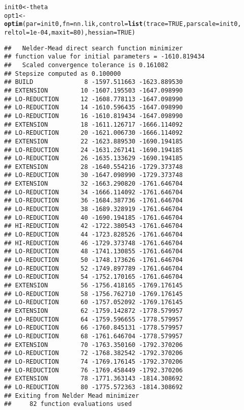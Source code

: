 \documentclass{article}\usepackage{graphicx, color}
\makeatletter
\newcommand{\hlfunctioncall}[1]{\textcolor[rgb]{0.501960784313725,0,0.329411764705882}{\textbf{#1}}}%
\newenvironment{kframe}{%
 \def\at@end@of@kframe{}%
 \ifinner\ifhmode%
  \def\at@end@of@kframe{\end{minipage}}%
  \begin{minipage}{\columnwidth}%
 \fi\fi%
 \def\FrameCommand##1{\hskip\@totalleftmargin \hskip-\fboxsep
 \colorbox{shadecolor}{##1}\hskip-\fboxsep
     \hskip-\linewidth \hskip-\@totalleftmargin \hskip\columnwidth}%
 \MakeFramed {\advance\hsize-\width
   \@totalleftmargin\z@ \linewidth\hsize
   \@setminipage}}%
 {\par\unskip\endMakeFramed%
 \at@end@of@kframe}
\newenvironment{knitrout}{}{} %
\makeatother
\begin{document}
\begin{knitrout}
\color{fgcolor}\begin{kframe}
\begin{alltt}
init0 <- theta
opt1 <- \hlfunctioncall{optim}(par = init0, fn = nn.lik, control = \hlfunctioncall{list}(trace = TRUE, parscale = init0, 
    reltol = 1e-04, maxit = 80), hessian = TRUE)
\end{alltt}
\begin{verbatim}
##   Nelder-Mead direct search function minimizer
## function value for initial parameters = -1610.819434
##   Scaled convergence tolerance is 0.161082
## Stepsize computed as 0.100000
## BUILD              8 -1597.511663 -1623.889530
## EXTENSION         10 -1607.195503 -1647.098990
## LO-REDUCTION      12 -1608.778113 -1647.098990
## LO-REDUCTION      14 -1610.596435 -1647.098990
## LO-REDUCTION      16 -1610.819434 -1647.098990
## EXTENSION         18 -1611.126717 -1666.114092
## LO-REDUCTION      20 -1621.006730 -1666.114092
## EXTENSION         22 -1623.889530 -1690.194185
## LO-REDUCTION      24 -1631.267141 -1690.194185
## LO-REDUCTION      26 -1635.133629 -1690.194185
## EXTENSION         28 -1640.554216 -1729.373748
## LO-REDUCTION      30 -1647.098990 -1729.373748
## EXTENSION         32 -1663.290820 -1761.646704
## LO-REDUCTION      34 -1666.114092 -1761.646704
## LO-REDUCTION      36 -1684.387736 -1761.646704
## LO-REDUCTION      38 -1689.328919 -1761.646704
## LO-REDUCTION      40 -1690.194185 -1761.646704
## HI-REDUCTION      42 -1722.380543 -1761.646704
## LO-REDUCTION      44 -1723.828526 -1761.646704
## HI-REDUCTION      46 -1729.373748 -1761.646704
## LO-REDUCTION      48 -1741.130855 -1761.646704
## LO-REDUCTION      50 -1748.173626 -1761.646704
## LO-REDUCTION      52 -1749.897789 -1761.646704
## LO-REDUCTION      54 -1752.170165 -1761.646704
## EXTENSION         56 -1756.418165 -1769.176145
## LO-REDUCTION      58 -1756.762710 -1769.176145
## LO-REDUCTION      60 -1757.052092 -1769.176145
## EXTENSION         62 -1759.142872 -1778.579957
## LO-REDUCTION      64 -1759.596655 -1778.579957
## LO-REDUCTION      66 -1760.845131 -1778.579957
## LO-REDUCTION      68 -1761.646704 -1778.579957
## EXTENSION         70 -1763.350160 -1792.370206
## LO-REDUCTION      72 -1768.382542 -1792.370206
## LO-REDUCTION      74 -1769.176145 -1792.370206
## LO-REDUCTION      76 -1769.458449 -1792.370206
## EXTENSION         78 -1771.363143 -1814.308692
## LO-REDUCTION      80 -1775.572363 -1814.308692
## Exiting from Nelder Mead minimizer
##     82 function evaluations used

\end{verbatim}
\end{kframe}
\end{knitrout}
\end{document}
